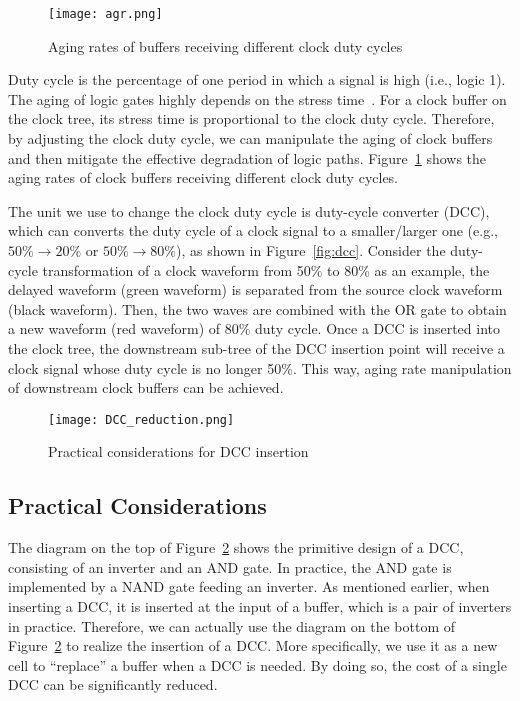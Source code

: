 \begin{figure}
    \centering
    \texttt{[image: agr.png]} %
    \caption{Aging rates of buffers receiving different clock duty cycles}
    \label{fig:agr}
\end{figure}

Duty cycle is the percentage of one period in which a signal is high (i.e., logic 1). The aging of logic gates highly depends on the stress time~\cite{wang2010impact}. For a clock buffer on the clock tree, its stress time is proportional to the clock duty cycle. Therefore, by adjusting the clock duty cycle, we can manipulate the aging of clock buffers and then mitigate the effective degradation of logic paths. Figure~\ref{fig:agr} shows the aging rates of clock buffers receiving different clock duty cycles. 

The unit we use to change the clock duty cycle is duty-cycle converter (DCC), which can converts the duty cycle of a clock signal to a smaller/larger one (e.g., $50\% \rightarrow 20\%$ or $50\% \rightarrow 80\%$), as shown in Figure~\ref{fig:dcc}. Consider the duty-cycle transformation of a clock waveform from 50\% to 80\% as an example, the delayed waveform (green waveform) is separated from the source clock waveform (black waveform). Then, the two waves are combined with the OR gate to obtain a new waveform (red waveform) of 80\% duty cycle. Once a DCC is inserted into the clock tree, the downstream sub-tree of the DCC insertion point will receive a clock signal whose duty cycle is no longer 50\%. This way, aging rate manipulation of downstream clock buffers can be achieved.


\begin{figure}
    \centering
    \texttt{[image: DCC\_reduction.png]} %
    \caption{Practical considerations for DCC insertion}
    \label{fig:dccreduc}
\end{figure}

\subsection{Practical Considerations}
\label{subsec:tpc}
The diagram on the top of Figure~\ref{fig:dccreduc} shows the primitive design of a DCC, consisting of an inverter and an AND gate. In practice, the AND gate is implemented by a NAND gate feeding an inverter. As mentioned earlier, when inserting a DCC, it is inserted at the input of a buffer, which is a pair of inverters in practice. Therefore, we can actually use the diagram on the bottom of Figure~\ref{fig:dccreduc} to realize the insertion of a DCC. More specifically, we use it as a new cell to \enquote{replace} a buffer when a DCC is needed. By doing so, the cost of a single DCC can be significantly reduced.%
